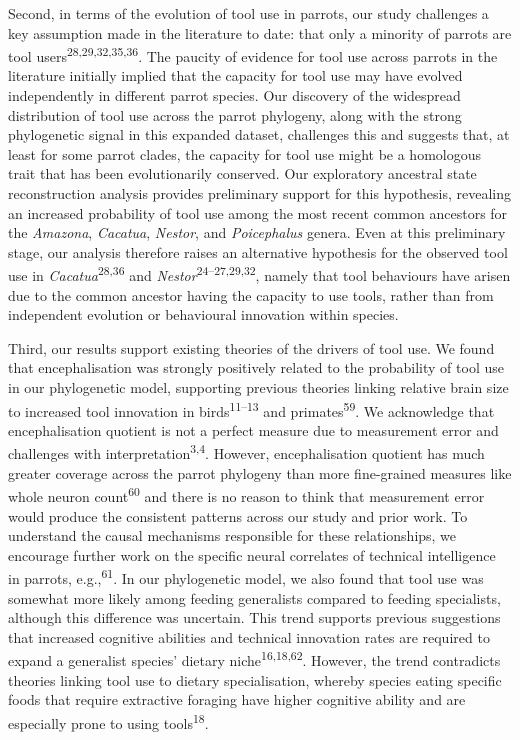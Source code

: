 \documentclass[
  man, donotrepeattitle,floatsintext]{apa6}
\begin{document}
Second, in terms of the evolution of tool use in parrots, our study challenges a
key assumption made in the literature to date: that only a minority of parrots
are tool users\textsuperscript{28,29,32,35,36}.
The paucity of evidence for tool use across parrots in the literature initially
implied that the capacity for tool use may have evolved independently in
different parrot species. Our discovery of the widespread distribution of tool
use across the parrot phylogeny, along with the strong phylogenetic signal in
this expanded dataset, challenges this and suggests that, at least for some
parrot clades, the capacity for tool use might be a homologous trait that has
been evolutionarily conserved. Our exploratory ancestral state reconstruction
analysis provides preliminary support for this hypothesis, revealing an
increased probability of tool use among the most recent common ancestors for the
\emph{Amazona}, \emph{Cacatua}, \emph{Nestor}, and \emph{Poicephalus} genera. Even at this
preliminary stage, our analysis therefore raises an alternative hypothesis for
the observed tool use in \emph{Cacatua}\textsuperscript{28,36} and
\emph{Nestor}\textsuperscript{24--27,29,32}, namely that tool behaviours have arisen due to the
common ancestor having the capacity to use tools, rather than from independent
evolution or behavioural innovation within species.

Third, our results support existing theories of the drivers of tool use. We
found that encephalisation was strongly positively related to the probability of
tool use in our phylogenetic model, supporting previous theories linking
relative brain size to increased tool innovation in birds\textsuperscript{11--13} and primates\textsuperscript{59}. We acknowledge that
encephalisation quotient is not a perfect measure due to measurement error and
challenges with interpretation\textsuperscript{3,4}. However, encephalisation
quotient has much greater coverage across the parrot phylogeny than more
fine-grained measures like whole neuron count\textsuperscript{60} and there is no reason
to think that measurement error would produce the consistent patterns across our
study and prior work. To understand the causal mechanisms responsible for these
relationships, we encourage further work on the specific neural correlates of
technical intelligence in parrots, e.g.,\textsuperscript{61}. In our phylogenetic
model, we also found that tool use was somewhat more likely among feeding
generalists compared to feeding specialists, although this difference was
uncertain. This trend supports previous suggestions that increased cognitive
abilities and technical innovation rates are required to expand a generalist
species' dietary niche\textsuperscript{16,18,62}. However, the trend contradicts theories linking tool use to
dietary specialisation, whereby species eating specific foods that require
extractive foraging have higher cognitive ability and are especially prone to
using tools\textsuperscript{18}.
\end{document}
